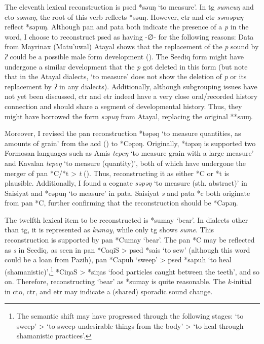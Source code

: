 The eleventh lexical reconstruction is \acl{psed} *səuŋ `to measure'. In \acl{tg} \textit{sumeuŋ} and \acl{cto} \textit{səmuŋ}, the root of this verb reflects *səuŋ. However, \acl{ctr} and \acl{etr} \textit{səməpuŋ} reflect *səpuŋ. Although \acl{pan} and \acl{pata} both indicate the presence of a \textit{p} in the word, I choose to reconstruct \acl{psed} as having -∅- for the following reasons: Data from Mayrinax (Matu'uwal) Atayal shows that the replacement of the \textit{p} sound by \textit{ʔ} could be a possible male form development (\cite[12]{li1983gender}). The Seediq form might have undergone a similar development that the \textit{p} got deleted in this form (but note that in the Atayal dialects, `to measure' does not show the deletion of \textit{p} or its replacement by \textit{ʔ} in any dialects). Additionally, although subgrouping issues have not yet been discussed, \acl{ctr} and \acl{etr} indeed have a very close oral/recorded history connection and should share a segment of developmental history. Thus, they might have borrowed the form \textit{səpuŋ} from Atayal, replacing the original **səuŋ.

Moreover, I revised the \acs{pan} reconstruction *təpəŋ `to measure quantities, as amounts of grain' from the \ac{acd} (\cite{ACD}) to *Cəpəŋ. Originally, *təpəŋ is supported two Formosan languages such as Amis \textit{tepeŋ} `to measure grain with a large measure' and Kavalan \textit{tepeŋ} `to measure (quantity)', both of which have undergone the merger of \acs{pan} *C/*t > \textit{t} (\cite[44]{blust1999subgrouping}). Thus, reconstructing it as either *C or *t is plausible. Additionally, I found a cognate \textit{səpəŋ} `to measure (sth. abstract)' in Saisiyat and *cəpuŋ `to measure' in \acl{pata}. Saisiyat \textit{s} and \acl{pata} *c both originate from \acs{pan} *C, further confirming that the reconstruction should be *Cəpəŋ.


The twelfth lexical item to be reconstructed is *sumay `bear'. In dialects other than \acl{tg}, it is represented as \textit{kumay}, while only \acl{tg} shows \textit{sume}. This reconstruction is supported by \acs{pan} *Cumay `bear'. The \acs{pan} *C may be reflected as \textit{s} in Seediq, as seen in \acs{pan} *CaqiS > \acs{psed} *sais `to sew' (although this word could be a loan from Pazih), \acs{pan} *Capuh `sweep' > \acs{psed} *sapuh `to heal (shamanistic)',\footnote{The semantic shift may have progressed through the following stages: `to sweep' > `to sweep undesirable things from the body' > `to heal through shamanistic practices'.} *CiŋaS > *siŋas `food particles caught between the teeth', and so on. Therefore, reconstructing `bear' as *sumay is quite reasonable. The \textit{k-}initial in \acl{cto}, \acl{ctr}, and \acl{etr} may indicate a (shared) sporadic sound change.

